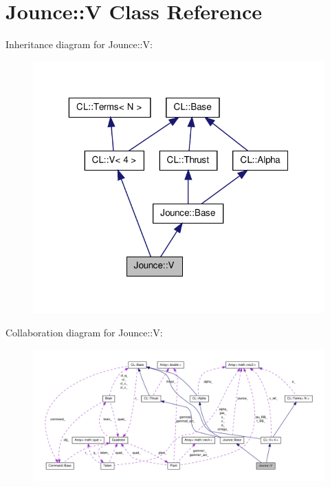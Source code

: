 \hypertarget{classJounce_1_1V}{\section{\-Jounce\-:\-:\-V \-Class \-Reference}
\label{classJounce_1_1V}
}


\-Inheritance diagram for \-Jounce\-:\-:\-V\-:\nopagebreak
\begin{figure}[H]
\begin{center}
\leavevmode
\includegraphics[width=319pt]{classJounce_1_1V__inherit__graph}
\end{center}
\end{figure}


\-Collaboration diagram for \-Jounce\-:\-:\-V\-:\nopagebreak
\begin{figure}[H]
\begin{center}
\leavevmode
\includegraphics[width=350pt]{classJounce_1_1V__coll__graph}
\end{center}
\end{figure}
